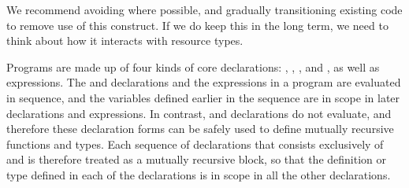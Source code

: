 \documentclass{article}
\begin{document}
\begin{mdP}[class={indent},data-line={405}]%
{}We recommend avoiding %
{}%
{} where possible, and gradually transitioning
existing %
{}%
{} code to remove use of this construct.  If we do keep this
in the long term, we need to think about how it interacts with resource
types.%
\end{mdP}%
\begin{mdP}[data-line={414}]%
{}Programs are made up of four kinds of core
declarations: %
{}%
{}, %
{}%
{}, %
{}%
{}, and %
{}%
{}, as well as expressions.
The %
{}%
{} and %
{}%
{} declarations and the expressions in a program
are evaluated
in sequence, and the variables defined earlier in the sequence are
in scope in later declarations and expressions.  In contrast,
{}%
{} and %
{}%
{} declarations do not evaluate, and therefore these
declaration forms can be safely used to define mutually recursive
functions and types.  Each sequence of declarations that consists
exclusively of %
{}%
{} and %
{}%
{} is therefore treated as a mutually
recursive block, so that the definition or type defined in each of
the declarations is in scope in all the other declarations.%
\end{mdP}%
\end{document}
